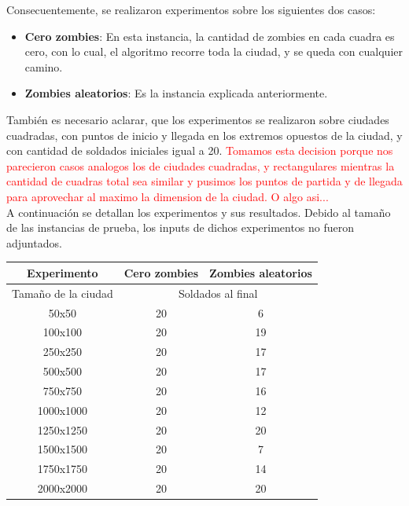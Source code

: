 Consecuentemente, se realizaron experimentos sobre los siguientes dos casos:
\begin{itemize}
	\item \textbf{Cero zombies}: En esta instancia, la cantidad de zombies en cada cuadra es cero, con lo cual, el algoritmo recorre toda la ciudad, y se queda con cualquier camino.
	\item \textbf{Zombies aleatorios}: Es la instancia explicada anteriormente.
\end{itemize}

También es necesario aclarar, que los experimentos se realizaron sobre ciudades cuadradas, con puntos de inicio y llegada en los extremos opuestos de la ciudad, y con cantidad de soldados iniciales igual a 20. \textcolor{red}{Tomamos esta decision porque nos parecieron casos analogos los de ciudades cuadradas, y rectangulares mientras la cantidad de cuadras total sea similar y pusimos los puntos de partida y de llegada para aprovechar al maximo la dimension de la ciudad. O algo asi...}\\

A continuación se detallan los experimentos y sus resultados.
Debido al tamaño de las instancias de prueba, los inputs de dichos experimentos no fueron adjuntados.
\begin{center}
	\begin{tabular}{|c|c|c|}
	\hline
	Experimento & \textbf{Cero zombies} & \textbf{Zombies aleatorios}\\
	\hline
	\hline
	Tamaño de la ciudad & \multicolumn{2}{|c|}{Soldados al final}\\
	\hline
	50x50 & 20 & 6\\
	\hline
	100x100 & 20 & 19\\
	\hline
	250x250 & 20 & 17\\
	\hline
	500x500 & 20 & 17\\
	\hline
	750x750 & 20 & 16\\
	\hline
	1000x1000 & 20 & 12\\
	\hline
	1250x1250 & 20 & 20\\
	\hline
	1500x1500 & 20 & 7\\
	\hline
	1750x1750 & 20 & 14\\
	\hline
	2000x2000 & 20 & 20\\
	\hline
	\end{tabular}
\end{center}



\newpage


